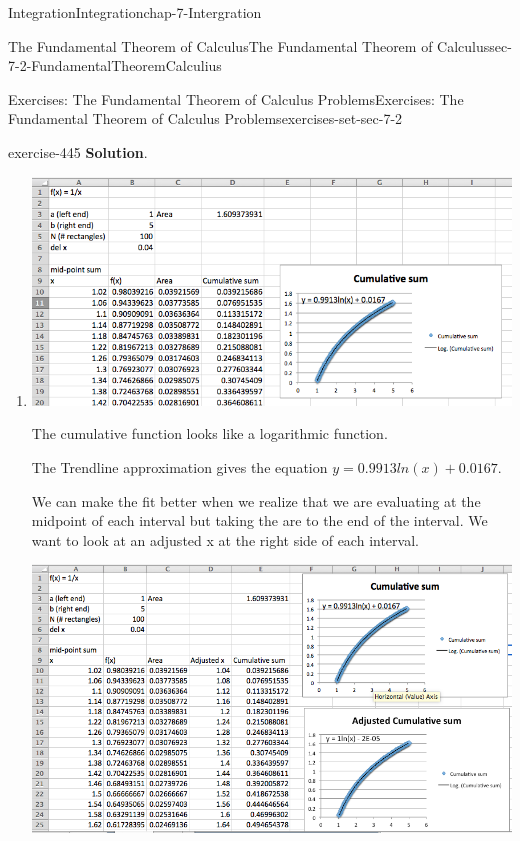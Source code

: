 \documentclass[oneside,10pt,]{book}
\numberwithin{equation}{section}
\begin{document}
\begin{chapterptx}{Integration}{}{Integration}{}{}{chap-7-Intergration}
\begin{sectionptx}{The Fundamental Theorem of Calculus}{}{The Fundamental Theorem of Calculus}{}{}{sec-7-2-FundamentalTheoremCalculius}
\begin{exercises-subsection-numberless}{Exercises: The Fundamental Theorem of Calculus Problems}{}{Exercises: The Fundamental Theorem of Calculus Problems}{}{}{exercises-set-sec-7-2}
\begin{divisionexercise}{11}{}{}{exercise-445}
\noindent\textbf{Solution}.\hypertarget{solution-225}{}\quad%
\leavevmode%
\begin{enumerate}[label=(\alph*)]
\item\hypertarget{li-752}{}\leavevmode%
\begin{sidebyside}{1}{0}{0}{0}%
\begin{sbspanel}{1}%
\includegraphics[width=1\linewidth]{images/sec7-2-sol11a.png}
\end{sbspanel}%
\end{sidebyside}%
\par
\hypertarget{p-2715}{}%
The cumulative function looks like a logarithmic function.%
\par
\hypertarget{p-2716}{}%
The Trendline approximation gives the equation \(y = 0.9913ln(x) + 0.0167\).%
\par
\hypertarget{p-2717}{}%
We can make the fit better when we realize that we are evaluating at the midpoint of each interval but taking the are to the end of the interval.  We want to look at an adjusted x at the right side of each interval.%
\begin{sidebyside}{1}{0}{0}{0}%
\begin{sbspanel}{1}%
\includegraphics[width=1\linewidth]{images/sec7-2-sol11b.png}

\end{sbspanel}
\end{sidebyside}
\end{enumerate}
\end{divisionexercise}
\end{exercises-subsection-numberless}
\end{sectionptx}
\end{chapterptx}
\end{document}
